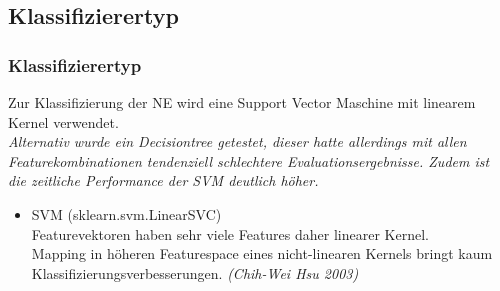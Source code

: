 \documentclass{beamer}
\begin{document}
	\subsection{Klassifizierertyp}
	\begin{frame}
		\frametitle{Klassifizierertyp}
		Zur Klassifizierung der NE wird eine Support Vector Maschine mit linearem Kernel verwendet.\\
		
		\textit{Alternativ wurde ein Decisiontree getestet, dieser hatte allerdings mit allen Featurekombinationen tendenziell schlechtere Evaluationsergebnisse. Zudem ist die zeitliche Performance der SVM deutlich höher.}\\
		
		\begin{itemize}
			\item SVM (sklearn.svm.LinearSVC)\\
			
				Featurevektoren haben sehr viele Features
				daher linearer Kernel.\\
				Mapping in höheren Featurespace eines nicht-linearen Kernels bringt kaum Klassifizierungsverbesserungen. \textit{(Chih-Wei Hsu 2003)}\\
		\end{itemize}
	\end{frame}
\end{document}
